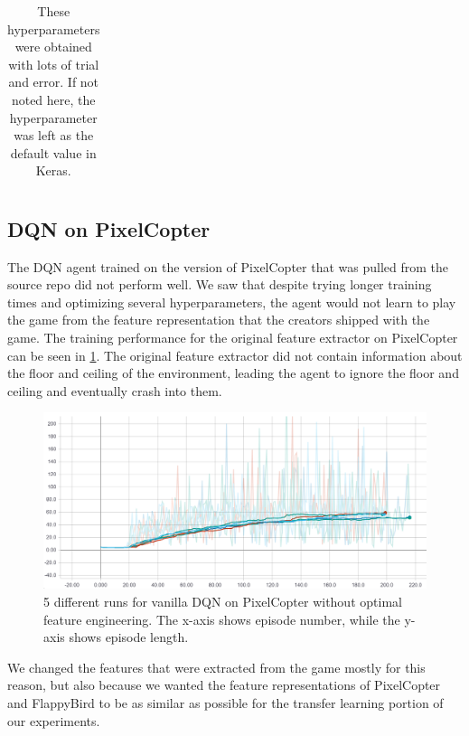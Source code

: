 \documentclass{article}
\begin{document}
\begin{table}[h!]
\begin{tabular}{ll}
\\

\end{tabular}
\caption{These hyperparameters were obtained with lots of trial and error. If not noted here, the hyperparameter was left as the default value in Keras.}
\label{hyperparams-xavier}
\end{table}

\subsection{DQN on PixelCopter}

The DQN agent trained on the version of PixelCopter that was pulled from the source repo did not perform well.
We saw that despite trying longer training times and optimizing several hyperparameters, the agent would not learn to play the game from the feature representation that the creators shipped with the game.
The training performance for the original feature extractor on PixelCopter can be seen in \ref{fig:other-training}.
The original feature extractor did not contain information about the floor and ceiling of the environment, leading the agent to ignore the floor and ceiling and eventually crash into them.

\begin{figure}[h!]
\includegraphics[width=\textwidth]{pixelcopter-training}
\caption{5 different runs for vanilla DQN on PixelCopter without optimal feature engineering. The x-axis shows episode number, while the y-axis shows episode length.}
\label{fig:other-training}
\end{figure}

We changed the features that were extracted from the game mostly for this reason, but also because we wanted the feature representations of PixelCopter and FlappyBird to be as similar as possible for the transfer learning portion of our experiments.
\end{document}
